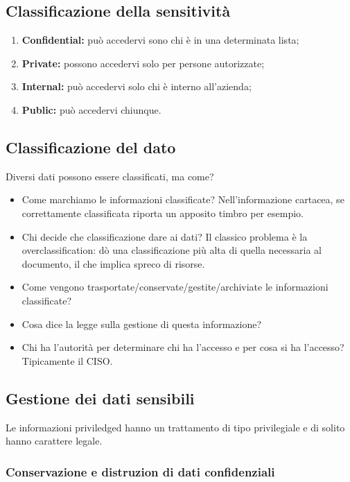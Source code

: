 \subsection{Classificazione della sensitività}

\begin{enumerate}
\item \textbf{Confidential:} può accedervi sono chi è in una determinata lista;
\item \textbf{Private:} possono accedervi solo per persone autorizzate;
\item \textbf{Internal:} può accedervi solo chi è interno all'azienda;
\item \textbf{Public:} può accedervi chiunque.
\end{enumerate}


\subsection{Classificazione del dato}

Diversi dati possono essere classificati, ma come?

\begin{itemize}
\item Come marchiamo le informazioni classificate? Nell'informazione cartacea,
se correttamente classificata riporta un apposito timbro per esempio.
\item Chi decide che classificazione dare ai dati? Il classico problema è la
overclassification: dò una classificazione più alta di quella necessaria al
documento, il che implica spreco di risorse.
\item Come vengono trasportate/conservate/gestite/archiviate le informazioni
classificate?
\item Cosa dice la legge sulla gestione di questa informazione?
\item Chi ha l'autorità per determinare chi ha l'accesso e per cosa si ha
l'accesso? Tipicamente il CISO.
\end{itemize}

\subsection{Gestione dei dati sensibili}

Le informazioni priviledged hanno un trattamento di tipo privilegiale e di
solito hanno carattere legale.

\subsubsection{Conservazione e distruzion di dati confidenziali}

